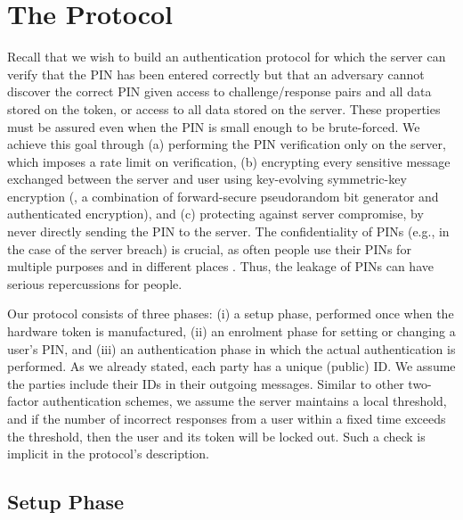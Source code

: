 
\section{The Protocol}\label{sec::the-protocol}

Recall that we wish to build an authentication protocol for which the server can verify that the PIN has been entered correctly but that an adversary cannot discover the correct PIN given access to challenge/response pairs and all data stored on the token, or access to all data stored on the server. 
These properties must be assured even when the PIN is small enough to be brute-forced.
We achieve this goal through (a) performing the PIN verification only on the server, which imposes a rate limit on verification, (b) encrypting every sensitive message exchanged between the server and user using key-evolving symmetric-key encryption (\ie, a combination of forward-secure pseudorandom bit generator and authenticated encryption), and (c) protecting against server compromise, by never directly sending the PIN to the server. 
%
The confidentiality of PINs (e.g., in the case of the server breach) is crucial, as often people use their PINs for multiple purposes and in different places \cite{MurdochBAABHSS16}. Thus, the leakage of PINs can have serious repercussions for people.   


Our protocol consists of three phases: (i) a setup phase, performed once when the hardware token is manufactured, (ii) an enrolment phase for setting or changing a user's PIN, and (iii) an authentication phase in which the actual authentication is performed. As we already stated, each party has a unique (public) ID. We assume the parties include their IDs in their outgoing messages.  Similar to other two-factor authentication schemes, we assume the server maintains a local threshold, and if the number of incorrect responses from a user within a fixed time exceeds the threshold, then the user and its token will be locked out. Such a check is implicit in the protocol's description. 

\subsection{Setup Phase}
\label{sec:setup}

